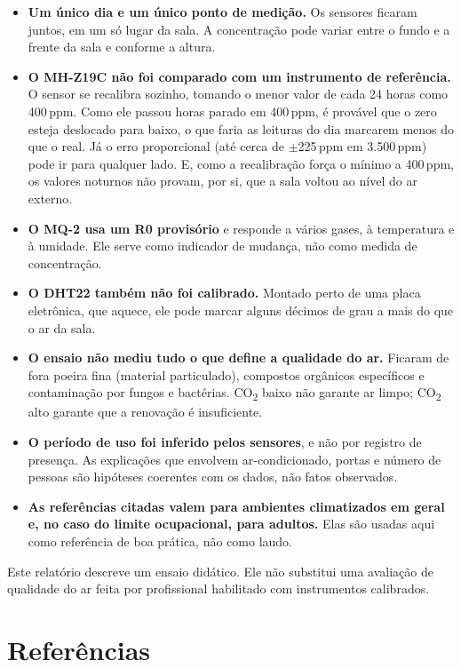 \documentclass[11pt,a4paper]{article}
\newcommand{\cod}{CO\textsubscript{2}}
\begin{document}
\begin{itemize}
\item \textbf{Um único dia e um único ponto de medição.} Os sensores ficaram juntos, em um só lugar da sala. A concentração pode variar entre o fundo e a frente da sala e conforme a altura.
\item \textbf{O MH-Z19C não foi comparado com um instrumento de referência.} O sensor se recalibra sozinho, tomando o menor valor de cada 24 horas como 400\,ppm. Como ele passou horas parado em 400\,ppm, é provável que o zero esteja deslocado para baixo, o que faria as leituras do dia marcarem menos do que o real. Já o erro proporcional (até cerca de $\pm$225\,ppm em 3.500\,ppm) pode ir para qualquer lado. E, como a recalibração força o mínimo a 400\,ppm, os valores noturnos não provam, por si, que a sala voltou ao nível do ar externo.
\item \textbf{O MQ-2 usa um R0 provisório} e responde a vários gases, à temperatura e à umidade. Ele serve como indicador de mudança, não como medida de concentração.
\item \textbf{O DHT22 também não foi calibrado.} Montado perto de uma placa eletrônica, que aquece, ele pode marcar alguns décimos de grau a mais do que o ar da sala.
\item \textbf{O ensaio não mediu tudo o que define a qualidade do ar.} Ficaram de fora poeira fina (material particulado), compostos orgânicos específicos e contaminação por fungos e bactérias. \cod{} baixo não garante ar limpo; \cod{} alto garante que a renovação é insuficiente.
\item \textbf{O período de uso foi inferido pelos sensores}, e não por registro de presença. As explicações que envolvem ar-condicionado, portas e número de pessoas são hipóteses coerentes com os dados, não fatos observados.
\item \textbf{As referências citadas valem para ambientes climatizados em geral e, no caso do limite ocupacional, para adultos.} Elas são usadas aqui como referência de boa prática, não como laudo.
\end{itemize}

Este relatório descreve um ensaio didático. Ele não substitui uma avaliação de qualidade do ar feita por profissional habilitado com instrumentos calibrados.

\section*{Referências}
\end{document}
